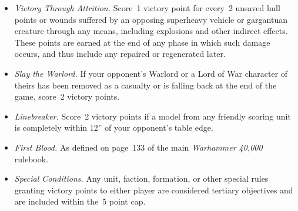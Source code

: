 \begin{itemize}[noitemsep]
\item \textit{Victory Through Attrition.}  Score~1 victory point for
  every~2 unsaved hull points or wounds suffered by an opposing
  superheavy vehicle or gargantuan creature through any means,
  including explosions and other indirect effects.  These points are
  earned at the end of any phase in which such damage occurs, and thus
  include any repaired or regenerated later.

\item \textit{Slay the Warlord.}  If your opponent's Warlord or a Lord
  of War character of theirs has been removed as a casualty or is
  falling back at the end of the game, score~2 victory points.

\item \textit{Linebreaker.}  Score~2 victory points if a model from
  any friendly scoring unit is completely within 12'' of your
  opponent's table edge.

\item \textit{First Blood.}  As defined on page~133 of the main
  \emph{Warhammer 40,000} rulebook.

\item \textit{Special Conditions.}  Any unit, faction, formation, or
  other special rules granting victory points to either player are
  considered tertiary objectives and are included within the~5 point
  cap.
\end{itemize}


\newcommand{\missiontitle}[1]{\clearpage\section{#1}}
\newcommand{\missionheading}[1]{\subsection{#1}}
\newcommand{\missionsubheading}[1]{\paragraph{#1}}
\setlength{\headingspacing}{0pt}

%















